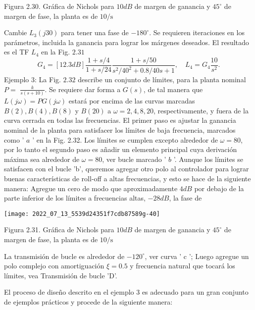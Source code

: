 Figura 2.30. Gráfica de Nichols para $10 d B$ de margen de ganancia y $45^{\circ}$ de margen de fase, la planta es de $10 / \mathrm{s}$

Cambie $L_{3}(j 30)$ para tener una fase de $-180^{\circ}$. Se requieren iteraciones en los parámetros, incluida la ganancia para lograr los márgenes deseados. El resultado es el TF $L_{4}$ en la Fig. $2.31$
$$
G_{4}=[12.3 d B] \frac{1+s / 4}{1+s / 24} \frac{1+s / 50}{s^{2} / 40^{2}+0.8 / 40 s+1}, \quad L_{4}=G_{4} \frac{10}{s^{2}} .
$$
Ejemplo 3: La Fig. $2.32$ describe un conjunto de límites, para la planta nominal $P=$ $\frac{k}{s(s+10)}$. Se requiere dar forma a $G(s)$, de tal manera que $L(j \omega)=P G(j \omega)$ estará por encima de las curvas marcadas $B(2), B(4), B(8)$ y $B(20)$ a $\omega=2,4,8,20$, respectivamente, y fuera de la curva cerrada en todas las frecuencias. El primer paso es ajustar la ganancia nominal de la planta para satisfacer los límites de baja frecuencia, marcados como ' $a$ ' en la Fig. 2.32. Los límites se cumplen excepto alrededor de $\omega=80$, por lo tanto el segundo paso es añadir un elemento principal cuya derivación máxima sea alrededor de $\omega=80$, ver bucle marcado ' $b$ '. Aunque los límites se satisfacen con el bucle 'b', queremos agregar otro polo al controlador para lograr buenas características de roll-off a altas frecuencias, y esto se hace de la siguiente manera: Agregue un cero de modo que aproximadamente $ 4 d B$ por debajo de la parte inferior de los límites a frecuencias altas, $ -28 d B$, la fase de

\texttt{[image: 2022\_07\_13\_5539d24351f7cdb87589g-40]}

Figura 2.31. Gráfica de Nichols para $10 d B$ de margen de ganancia y $45^{\circ}$ de margen de fase, la planta es de $10 / \mathrm{s}$

La transmisión de bucle es alrededor de $-120^{\circ}$, ver curva ' $\mathrm{c}$ '; Luego agregue un polo complejo con amortiguación $\xi = 0.5$ y frecuencia natural que tocará los límites, vea Transmisión de bucle 'D'.

El proceso de diseño descrito en el ejemplo 3 es adecuado para un gran conjunto de ejemplos prácticos y procede de la siguiente manera:

